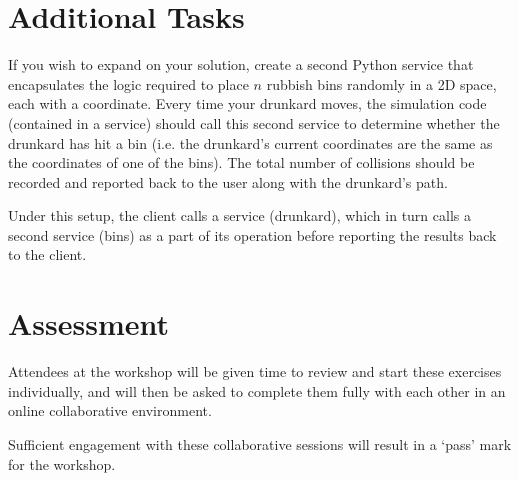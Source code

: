 \documentclass{article}
\begin{document}
\section{Additional Tasks}

If you wish to expand on your solution, create a second Python service that encapsulates the logic required to place $n$ rubbish bins randomly in a 2D space, each with a coordinate. 
Every time your drunkard moves, the simulation code (contained in a service) should call this second service to determine whether the drunkard has hit a bin (i.e. the drunkard's current coordinates are the same as the coordinates of one of the bins).
The total number of collisions should be recorded and reported back to the user along with the drunkard's path.

Under this setup, the client calls a service (drunkard), which in turn calls a second service (bins) as a part of its operation before reporting the results back to the client.

\section{Assessment}

Attendees at the workshop will be given time to review and start these exercises individually, and will then be asked to complete them fully with each other in an online collaborative environment.

Sufficient engagement with these collaborative sessions will result in a `pass' mark for the workshop.
\end{document}
